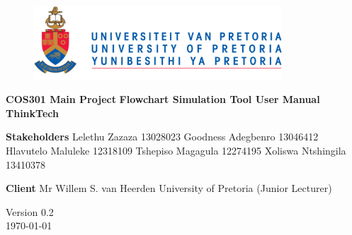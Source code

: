 \begin{titlepage}
	\begin{center}
		
		\begin{figure}[t]
			\centering
			\includegraphics[width=350px]{UP_Logo.png}
		\end{figure}	
	
	\begin{flushright} 
		
		\textbf{\LARGE COS301 Main Project}
		\newline \newline \newline
		\textbf{\LARGE Flowchart Simulation Tool User Manual}
		\newline \newline \newline
 		\textbf{\LARGE ThinkTech}
		\newline \newline \newline
	\end{flushright}
	
	\begin{flushright} \large
			
			\textbf{\LARGE Stakeholders}\newline 
			Lelethu Zazaza 13028023\newline
			Goodness Adegbenro 13046412\newline
			Hlavutelo Maluleke 12318109\newline
			Tshepiso Magagula 12274195\newline
			Xoliswa Ntshingila 13410378\newline
			
			
	\end{flushright}
	
	\begin{flushright} \large
	
			\textbf{\LARGE Client}\newline 
			Mr Willem S. van Heerden \newline
			University of Pretoria (Junior Lecturer)\newline
			
	\end{flushright}
		
		\vspace{1 cm}
		

		
		\vfill
		
		{\LARGE Version 0.2}
		\\
		{\large \today}		
		
		
	\end{center}
\end{titlepage}

